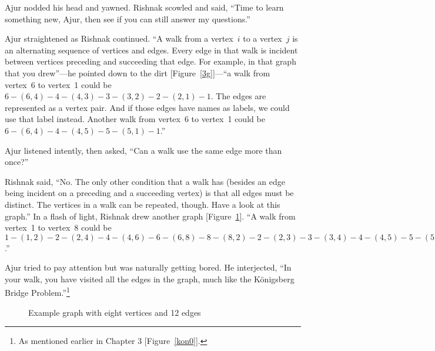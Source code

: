 Ajur nodded his head and yawned.
Rishnak scowled and said, ``Time to learn something new, Ajur, then see if you can still answer my questions.''

Ajur straightened as Rishnak continued. ``A walk from a vertex~$i$ to a vertex~$j$ is an alternating sequence of vertices and edges. Every edge in that walk is incident between vertices preceding and succeeding that edge. For example, in that graph that you drew''---he pointed down to the dirt [Figure~\ref{3g}]---``a walk from vertex~6 to vertex~1 could be $6-(6,4)-4-(4,3)-3-(3,2)-2-(2,1)-1$. The edges are represented as a vertex pair. And if those edges have names as labels, we could use that label instead. Another walk from vertex~6 to vertex~1 could be $6-(6,4)-4-(4,5)-5-(5,1)-1$.''

Ajur listened intently, then asked, ``Can a walk use the same edge more than once?''

Rishnak said, ``No. The only other condition that a walk has (besides an edge being incident on a preceding and a succeeding vertex) is that all edges must be distinct. The vertices in a walk can be repeated, though. Have a look at this graph.'' In a flash of light, Rishnak drew another graph [Figure~\ref{3g3}]. ``A walk from vertex~1 to vertex~8 could be $1-(1,2)-2-(2,4)-4-(4,6)-6-(6,8)-8-(8,2)-2-(2,3)-3-(3,4)-4-(4,5)-5-(5,6)-6-(6,7)-7-(7,8)-8$.''

Ajur tried to pay attention but was naturally getting bored. He interjected, ``In your walk, you have visited all the edges in the graph, much like the K\"{o}nigsberg Bridge Problem.''\footnote{As mentioned earlier in Chapter 3 [Figure~\ref{kon0}].}

\begin{figure}
\begin{center}
\caption{Example graph with eight vertices and 12 edges}\label{3g3}
\end{center}
\end{figure}

